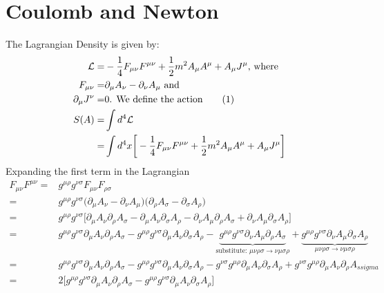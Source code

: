 \documentclass[]{article}
\newcommand\numberthis{\addtocounter{equation}{1}\tag{\theequation}}
\newcommand{\Lagr}{\mathcal{L}}
\begin{document}
\section{Coulomb and Newton}
The Lagrangian Density is given by:
\begin{align*}
	\Lagr =& -\frac{1}{4} F_{\mu\nu}F^{\mu\nu} + \frac{1}{2}m^2 A_{\mu}A^{\mu} + A_{\mu}J^{\mu} \text{, where}\\
	F_{\mu\nu} =& \partial_{\mu} A_{\nu} - \partial_{\nu} A_{\mu} \text{ and}\\
	\partial_{\mu}J^{\nu}=& 0 \text{. We define the action} \numberthis \label{eq:EM_continuity}\\
	S(A) =&\int d^4 \Lagr\\
	=&  \int d^4x \bigg[-\frac{1}{4} F_{\mu\nu}F^{\mu\nu} + \frac{1}{2}m^2 A_{\mu}A^{\mu} + A_{\mu}J^{\mu} \bigg]
\end{align*}
Expanding the first term in the Lagrangian
\begin{align*}
	F_{\mu\nu}F^{\mu\nu}=& g^{\mu\rho} g^{\nu\sigma}F_{\mu\nu}F_{\rho\sigma}\\
	=& g^{\mu\rho} g^{\nu\sigma} \big(\partial_{\mu} A_{\nu} - \partial_{\nu} A_{\mu}\big)\big(\partial_{\rho} A_{\sigma} - \partial_{\sigma} A_{\rho}\big)\\
	=& g^{\mu\rho} g^{\nu\sigma}\big[\partial_{\mu} A_{\nu}\partial_{\rho} A_{\sigma} -\partial_{\mu} A_{\nu}\partial_{\sigma} A_{\rho} -\partial_{\nu} A_{\mu}\partial_{\rho} A_{\sigma} + \partial_{\nu} A_{\mu}\partial_{\sigma} A_{\rho}\big]\\
	=& g^{\mu\rho} g^{\nu\sigma} \partial_{\mu} A_{\nu}\partial_{\rho} A_{\sigma} -g^{\mu\rho} g^{\nu\sigma} \partial_{\mu} A_{\nu}\partial_{\sigma} A_{\rho} -\underbrace{g^{\mu\rho} g^{\nu\sigma} \partial_{\nu} A_{\mu}\partial_{\rho} A_{\sigma}}_\text{substitute: $\mu\nu\rho\sigma\rightarrow\nu\mu\sigma\rho$} +\underbrace{g^{\mu\rho} g^{\nu\sigma} \partial_{\nu} A_{\mu}\partial_{\sigma} A_{\rho}}_\text{$\mu\nu\rho\sigma\rightarrow\nu\mu\sigma\rho$}	\\
	=& g^{\mu\rho} g^{\nu\sigma} \partial_{\mu} A_{\nu}\partial_{\rho} A_{\sigma} -g^{\mu\rho} g^{\nu\sigma} \partial_{\mu} A_{\nu}\partial_{\sigma} A_{\rho} - g^{\nu\sigma} g^{\mu\rho} \partial_{\mu} A_{\nu}\partial_{\sigma} A_{\rho} +g^{\nu\sigma} g^{\mu\rho} \partial_{\mu} A_{\nu}\partial_{\rho} A_{ssigma}	\\
	=& 2 \big[g^{\mu\rho} g^{\nu\sigma} \partial_{\mu} A_{\nu}\partial_{\rho} A_{\sigma} -g^{\mu\rho} g^{\nu\sigma} \partial_{\mu} A_{\nu}\partial_{\sigma} A_{\rho}\big]
\end{align*}
\end{document}
